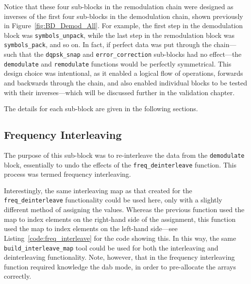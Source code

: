 \documentclass[class=report,11pt,crop=false]{standalone}
\begin{document}
Notice that these four sub-blocks in the remodulation chain were designed as inverses of the first four sub-blocks in the demodulation chain, shown previously in Figure~\ref{fig:BD_Demod_All}. For example, the first step in the demodulation block was \texttt{symbols\_unpack}, while the last step in the remodulation block was \texttt{symbols\_pack}, and so on. In fact, if perfect data was put through the chain---such that the \texttt{dqpsk\_snap} and \texttt{error\_correction} sub-blocks had no effect---the \texttt{demodulate} and \texttt{remodulate} functions would be perfectly symmetrical. This design choice was intentional, as it enabled a logical flow of operations, forwards and backwards through the chain, and also enabled individual blocks to be tested with their inverses---which will be discussed further in the validation chapter.

The details for each sub-block are given in the following sections.

\subsection{Frequency Interleaving \label{subsect:dab-proc_freq-interleave}}
The purpose of this sub-block was to re-interleave the data from the \texttt{demodulate} block, essentially to undo the effects of the \texttt{freq\_deinterleave} function. This process was termed frequency interleaving.

Interestingly, the same interleaving map as that created for the \texttt{freq\_deinterleave} functionality could be used here, only with a slightly different method of assigning the values. Whereas the previous function used the map to index elements on the right-hand side of the assignment, this function used the map to index elements on the left-hand side---see Listing~\ref{code:freq_interleave} for the code showing this. In this way, the same \texttt{build\_interleave\_map} tool could be used for both the interleaving and deinterleaving functionality. Note, however, that in the frequency interleaving function required knowledge the \gls{dab} mode, in order to pre-allocate the arrays correctly.
\end{document}
